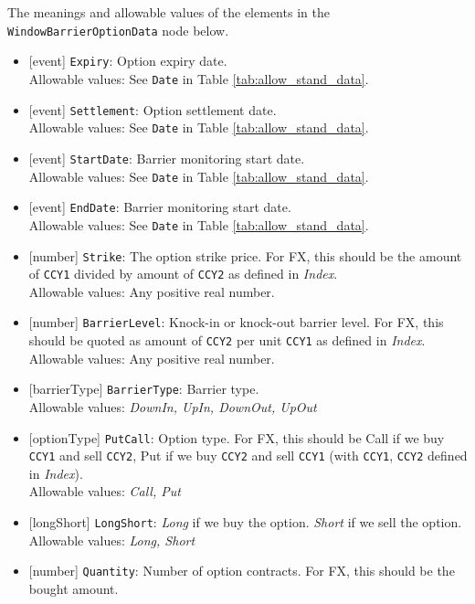 The meanings and allowable values of the elements in the \lstinline!WindowBarrierOptionData! node below.

\begin{itemize}
    \item{}[event] \lstinline!Expiry!: Option expiry date. \\
    Allowable values: See \lstinline!Date! in Table \ref{tab:allow_stand_data}.
    \item{}[event] \lstinline!Settlement!: Option settlement date. \\
    Allowable values: See \lstinline!Date! in Table \ref{tab:allow_stand_data}.
    \item{}[event] \lstinline!StartDate!: Barrier monitoring start date. \\
    Allowable values: See \lstinline!Date! in Table \ref{tab:allow_stand_data}.
    \item{}[event] \lstinline!EndDate!: Barrier monitoring start date. \\
    Allowable values: See \lstinline!Date! in Table \ref{tab:allow_stand_data}.
    \item{}[number] \lstinline!Strike!: The option strike price. For FX, this should be the amount of \lstinline!CCY1! divided by amount of \lstinline!CCY2! as defined in \emph{Index}. \\
    Allowable values: Any positive real number.
    \item{}[number] \lstinline!BarrierLevel!: Knock-in or knock-out barrier level. For FX, this should be quoted as amount of \lstinline!CCY2! per unit \lstinline!CCY1! as defined in \emph{Index}. \\
    Allowable values: Any positive real number.
    \item{}[barrierType] \lstinline!BarrierType!: Barrier type. \\
    Allowable values: \emph{DownIn, UpIn, DownOut, UpOut}
    \item{}[optionType] \lstinline!PutCall!: Option type. For FX, this should be Call if we buy \lstinline!CCY1! and sell \lstinline!CCY2!, Put if we buy \lstinline!CCY2! and sell \lstinline!CCY1! (with \lstinline!CCY1!, \lstinline!CCY2! defined in \emph{Index}). \\
    Allowable values: \emph{Call, Put}
    \item{}[longShort] \lstinline!LongShort!: \emph{Long} if we buy the option. \emph{Short} if we sell the option.
    Allowable values: \emph{Long, Short}
    \item{}[number] \lstinline!Quantity!: Number of option contracts. For FX, this should be the bought amount. \\

\end{itemize}
